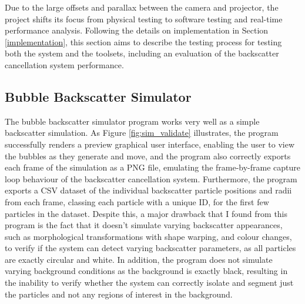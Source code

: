 Due to the large offsets and parallax between the camera and projector, the project shifts its focus from physical testing to software testing and real-time performance analysis. Following the details on implementation in Section \ref{implementation}, this section aims to describe the testing process for testing both the system and the toolsets, including an evaluation of the backscatter cancellation system performance.

\subsection{Bubble Backscatter Simulator}

The bubble backscatter simulator program works very well as a simple backscatter simulation. As Figure \ref{fig:sim_validate} illustrates, the program successfully renders a preview graphical user interface, enabling the user to view the bubbles as they generate and move, and the program also correctly exports each frame of the simulation as a PNG file, emulating the frame-by-frame capture loop behaviour of the backscatter cancellation system. Furthermore, the program exports a CSV dataset of the individual backscatter particle positions and radii from each frame, classing each particle with a unique ID, for the first few particles in the dataset. Despite this, a major drawback that I found from this program is the fact that it doesn't simulate varying backscatter appearances, such as morphological transformations with shape warping, and colour changes, to verify if the system can detect varying backscatter parameters, as all particles are exactly circular and white. In addition, the program does not simulate varying background conditions as the background is exactly black, resulting in the inability to verify whether the system can correctly isolate and segment just the particles and not any regions of interest in the background.

